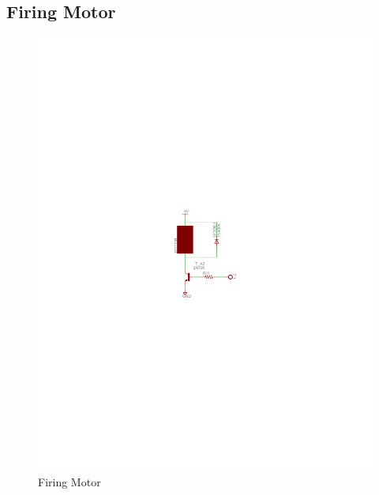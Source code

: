 \documentclass[a4paper, 11pt]{article}
\begin{document}
	\subsection{Firing Motor}
	\begin{figure}[!ht]
		\centering
		\vspace{-11cm}
		\includegraphics{report-images/firing-motor}
		\vspace{-11.5cm}
		\caption{Firing Motor}
	\end{figure}
\newpage
\end{document}
